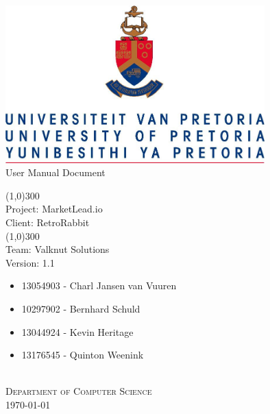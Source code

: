 \documentclass{article}
\begin{document}
	\begin{titlepage}
		\begin{center}
			\includegraphics[width=10cm]{images/UP.jpg}  \\
			[0.5cm]
			\huge{
			User Manual Document\\
			}
			
			\line(1,0){300}\\
			[0.2cm]
			\LARGE{Project: MarketLead.io\\
			Client: RetroRabbit} \\
			\line(1,0){300}\\
			\LARGE{Team: Valknut Solutions}\\
			[1.0cm]
			\large{Version: 1.1}\\
			[1.0cm]
			\large
			{
			\begin{itemize}
				\item 13054903 - Charl Jansen van Vuuren 
				\item 10297902 - Bernhard Schuld      
				\item 13044924 - Kevin Heritage
				\item 13176545 - Quinton Weenink\\
			\end{itemize}
			}
			\textsc{\large}\\
		[3.0cm]
		\textsc{\large  Department of Computer Science}\\
		[0.5cm]
		\textsc{\large \today}\\
		\end{center}
	\end{titlepage}
	
	\cleardoublepage
	\begin{versionhistory}
	\end{versionhistory}	
	
\end{document}
